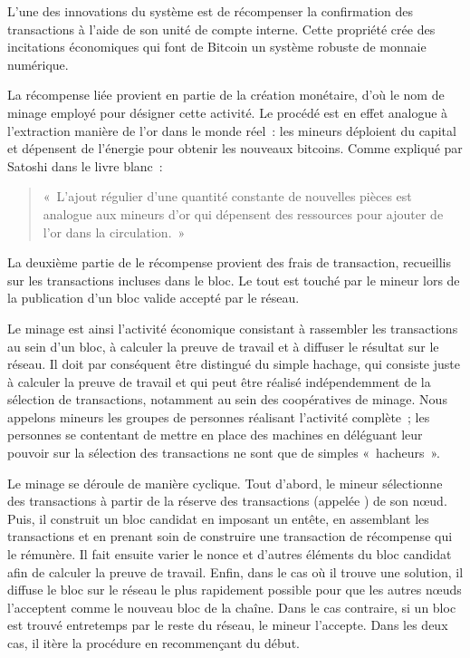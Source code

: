 
L'une des innovations du système est de récompenser la confirmation des transactions à l'aide de son unité de compte interne. Cette propriété crée des incitations économiques qui font de Bitcoin un système robuste de monnaie numérique.

La récompense liée provient en partie de la création monétaire, d'où le nom de minage employé pour désigner cette activité. Le procédé est en effet analogue à l'extraction manière de l'or dans le monde réel~: les mineurs déploient du capital et dépensent de l'énergie pour obtenir les nouveaux bitcoins. Comme expliqué par Satoshi dans le livre blanc~:

\begin{quote}
«~L'ajout régulier d'une quantité constante de nouvelles pièces est analogue aux mineurs d'or qui dépensent des ressources pour ajouter de l'or dans la circulation.~»
\end{quote}

La deuxième partie de le récompense provient des frais de transaction, recueillis sur les transactions incluses dans le bloc. Le tout est touché par le mineur lors de la publication d'un bloc valide accepté par le réseau.

Le minage est ainsi l'activité économique consistant à rassembler les transactions au sein d'un bloc, à calculer la preuve de travail et à diffuser le résultat sur le réseau. Il doit par conséquent être distingué du simple hachage, qui consiste juste à calculer la preuve de travail et qui peut être réalisé indépendemment de la sélection de transactions, notamment au sein des coopératives de minage. Nous appelons mineurs les groupes de personnes réalisant l'activité complète~; les personnes se contentant de mettre en place des machines en déléguant leur pouvoir sur la sélection des transactions ne sont que de simples «~hacheurs~».


Le minage se déroule de manière cyclique. Tout d'abord, le mineur sélectionne des transactions à partir de la réserve des transactions (appelée ) de son nœud. Puis, il construit un bloc candidat en imposant un entête, en assemblant les transactions et en prenant soin de construire une transaction de récompense qui le rémunère. Il fait ensuite varier le nonce et d'autres éléments du bloc candidat afin de calculer la preuve de travail. Enfin, dans le cas où il trouve une solution, il diffuse le bloc sur le réseau le plus rapidement possible pour que les autres nœuds l'acceptent comme le nouveau bloc de la chaîne. Dans le cas contraire, si un bloc est trouvé entretemps par le reste du réseau, le mineur l'accepte. Dans les deux cas, il itère la procédure en recommençant du début.

